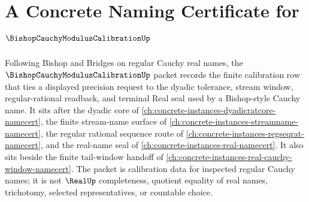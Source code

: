 \chapter{A Concrete Naming Certificate for $\BishopCauchyModulusCalibrationUp$}
\label{ch:concrete-instances-bishop-cauchy-modulus-calibration-namecert}

Following Bishop and Bridges on regular Cauchy real names, the $\BishopCauchyModulusCalibrationUp$ packet records the finite calibration row that ties a displayed precision request to the dyadic tolerance, stream window, regular-rational readback, and terminal Real seal used by a Bishop-style Cauchy name. It sits after the dyadic core of \autoref{ch:concrete-instances-dyadicratcore-namecert}, the finite stream-name surface of \autoref{ch:concrete-instances-streamname-namecert}, the regular rational sequence route of \autoref{ch:concrete-instances-regseqrat-namecert}, and the real-name seal of \autoref{ch:concrete-instances-real-namecert}. It also sits beside the finite tail-window handoff of \autoref{ch:concrete-instances-real-cauchy-window-namecert}. The packet is calibration data for inspected regular Cauchy names; it is not $\RealUp$ completeness, quotient equality of real names, trichotomy, selected representatives, or countable choice.

